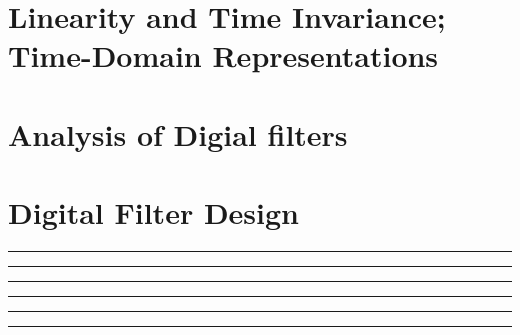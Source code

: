 \documentclass[10pt]{article}
\begin{document}
\newcommand{\josquote}[1]{
    \framebox{
    \parbox{\textwidth}{
    \textit{#1}
    }
    }
}

\newcommand{\paulhint}[1]{
    #1
}

\setlength\parindent{0pt}
\section{Linearity and Time Invariance; Time-Domain Representations}
%
%
%
%
%
\section{Analysis of Digial filters}
%
%
%
%
%
\section{Digital Filter Design}

\noindent\rule[0.5ex]{\linewidth}{0.5pt}

\noindent\rule[0.5ex]{\linewidth}{0.5pt}

\noindent\rule[0.5ex]{\linewidth}{0.5pt}

\noindent\rule[0.5ex]{\linewidth}{0.5pt}

\noindent\rule[0.5ex]{\linewidth}{0.5pt}

\noindent\rule[0.5ex]{\linewidth}{0.5pt}

\end{document}
